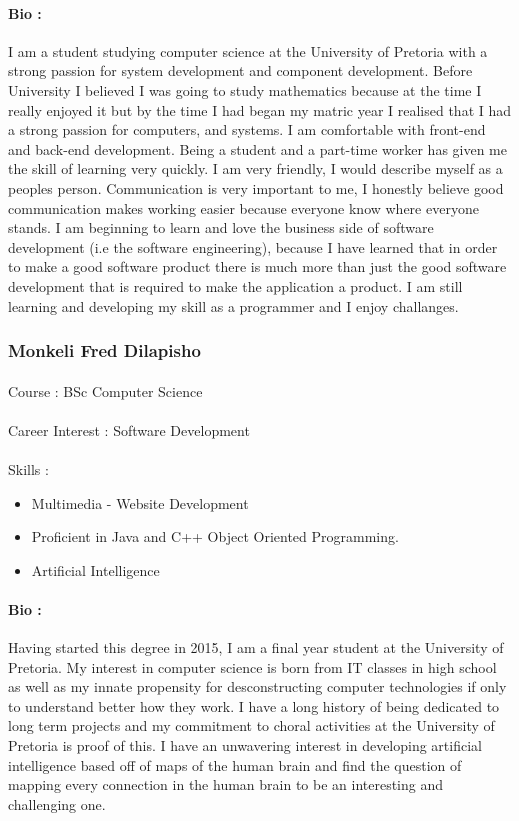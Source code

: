 \documentclass[11pt]{article}
\begin{document}
\paragraph{Bio :} I am a student studying computer science at the University of Pretoria with a strong passion for system development and component development. Before University I believed I was going to study mathematics because at the time I really enjoyed it but by the time I had began my matric year I realised that I had a strong passion for computers, and systems. I am comfortable with front-end and back-end development. Being a student and a part-time worker has given me the skill of learning very quickly. I am very friendly, I would describe myself as a peoples person. Communication is very important to me, I honestly believe good communication makes working easier because everyone know where everyone stands. I am beginning to learn and love the business side of software development (i.e the software engineering), because I have learned that in order to make a good software product there is much more than just the good software development that is required to make the application a product. I am still learning and developing my skill as a programmer and I enjoy challanges.

\subsubsection{Monkeli Fred Dilapisho}
\paragraph{}Course : BSc Computer Science
\paragraph{}Career Interest : Software Development
\paragraph{}Skills : 
\begin{itemize}
\item Multimedia - Website Development
\item Proficient in Java and C++ Object Oriented Programming.
\item Artificial Intelligence
\end{itemize}
\paragraph{Bio :}  Having started this degree in 2015, I am a final year student at the University of Pretoria. My interest in computer science is born from IT classes in high school as well as my innate propensity for desconstructing computer technologies if only to understand better how they work. I have a long history of being dedicated to long term projects and my commitment to choral activities at the University of Pretoria is proof of this. I have an unwavering interest in developing artificial intelligence based off of maps of the human brain and find the question of mapping every connection in the human brain to be an interesting and challenging one.
\end{document}
